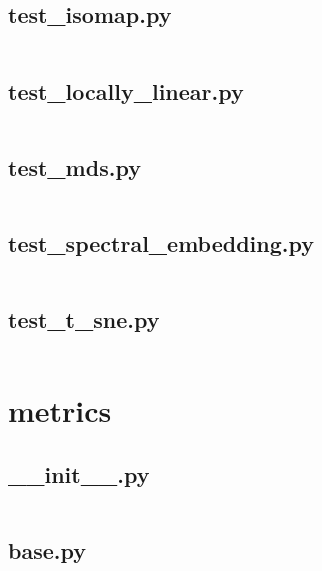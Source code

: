 \documentclass{article}
\begin{document}
\subsection{test\_isomap.py}
\inputminted{python}{/home/dufferzafar/dev/@clones/scikit-learn/sklearn/manifold/tests/test_isomap.py}
\newpage

\subsection{test\_locally\_linear.py}
\inputminted{python}{/home/dufferzafar/dev/@clones/scikit-learn/sklearn/manifold/tests/test_locally_linear.py}
\newpage

\subsection{test\_mds.py}
\inputminted{python}{/home/dufferzafar/dev/@clones/scikit-learn/sklearn/manifold/tests/test_mds.py}
\newpage

\subsection{test\_spectral\_embedding.py}
\inputminted{python}{/home/dufferzafar/dev/@clones/scikit-learn/sklearn/manifold/tests/test_spectral_embedding.py}
\newpage

\subsection{test\_t\_sne.py}
\inputminted{python}{/home/dufferzafar/dev/@clones/scikit-learn/sklearn/manifold/tests/test_t_sne.py}
\newpage

\section{metrics}

\subsection{\_\_init\_\_.py}
\inputminted{python}{/home/dufferzafar/dev/@clones/scikit-learn/sklearn/metrics/__init__.py}
\newpage

\subsection{base.py}
\inputminted{python}{/home/dufferzafar/dev/@clones/scikit-learn/sklearn/metrics/base.py}
\newpage
\end{document}
